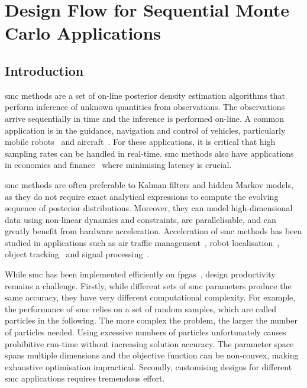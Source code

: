 
\chapter[Design Flow for SMC Applications]{Design Flow for Sequential Monte Carlo Applications}

\label{ch:flow}

\section{Introduction}
\label{sec:intro}

\gls{smc} methods are a set of on-line posterior density estimation algorithms that perform inference of unknown quantities from observations.
The observations arrive sequentially in time and the inference is performed on-line.
A common application is in the guidance, navigation and control of vehicles, particularly mobile robots~\cite{montemerlo02} and aircraft~\cite{kantas09}.
For these applications, it is critical that high sampling rates can be handled in real-time.
\gls{smc} methods also have applications in economics and finance~\cite{creal12} where minimising latency is crucial.
 
\gls{smc} methods are often preferable to Kalman filters and hidden Markov models, as they do not require exact analytical expressions to compute the evolving sequence of posterior distributions.
Moreover, they can model high-dimensional data using non-linear dynamics and constraints, are parallelisable, and can greatly benefit from hardware acceleration.
Acceleration of \gls{smc} methods has been studied in applications such as air traffic management~\cite{chau13b,eele13}, robot localisation~\cite{chau13a}, object tracking~\cite{happe13} and signal processing~\cite{hendeby07}.

While \gls{smc} has been implemented efficiently on \gls{fpga}s~\cite{chau13a,chau13b,happe13,hendeby07}, design productivity remains a challenge.
Firstly, while different sets of \gls{smc} parameters produce the same accuracy, they have very different computational complexity.
For example, the performance of \gls{smc} relies on a set of random samples, which are called particles in the following.
The more complex the problem, the larger the number of particles needed.
Using excessive numbers of particles unfortunately causes prohibitive run-time without increasing solution accuracy.
The parameter space spans multiple dimensions and the objective function can be non-convex, making exhaustive optimisation impractical.
Secondly, customising designs for different \gls{smc} applications requires tremendous effort.

